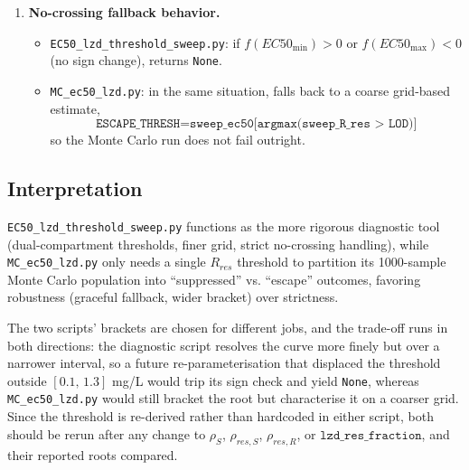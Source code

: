 \documentclass{article}
\begin{document}
\begin{enumerate}
  \item \textbf{No-crossing fallback behavior.}
  \begin{itemize}
    \item \texttt{EC50\_lzd\_threshold\_sweep.py}: if $f(EC50_{\min}) > 0$ or
          $f(EC50_{\max}) < 0$ (no sign change), returns \texttt{None}.
    \item \texttt{MC\_ec50\_lzd.py}: in the same situation, falls back to a
          coarse grid-based estimate,
          \[
            \texttt{ESCAPE\_THRESH} = \texttt{sweep\_ec50[argmax(sweep\_R\_res > LOD)]}
          \]
          so the Monte Carlo run does not fail outright.
  \end{itemize}
\end{enumerate}

\subsection*{Interpretation}
\texttt{EC50\_lzd\_threshold\_sweep.py} functions as the more rigorous
diagnostic tool (dual-compartment thresholds, finer grid, strict
no-crossing handling), while \texttt{MC\_ec50\_lzd.py} only needs a single
$R_{res}$ threshold to partition its 1000-sample Monte Carlo population
into ``suppressed'' vs. ``escape'' outcomes, favoring robustness
(graceful fallback, wider bracket) over strictness.

The two scripts' brackets are chosen for different jobs, and the trade-off
runs in both directions: the diagnostic script resolves the curve more
finely but over a narrower interval, so a future re-parameterisation that
displaced the threshold outside $[0.1,\,1.3]$ mg/L would trip its sign
check and yield \texttt{None}, whereas \texttt{MC\_ec50\_lzd.py} would
still bracket the root but characterise it on a coarser grid. Since the
threshold is re-derived rather than hardcoded in either script, both should
be rerun after any change to $\rho_S$, $\rho_{res,S}$, $\rho_{res,R}$, or
$\mathtt{lzd\_res\_fraction}$, and their reported roots compared.
\end{document}
